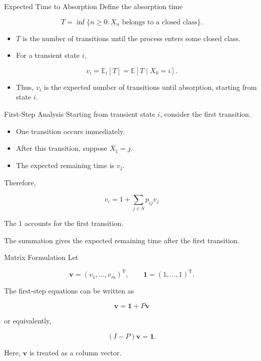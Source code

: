 \documentclass[
  ignorenonframetext,
  aspectratio=169,
]{beamer}
\providecommand{\tightlist}{%
  \setlength{\itemsep}{0pt}\setlength{\parskip}{0pt}}
\begin{document}
\begin{frame}{Expected Time to Absorption}
\protect{}\label{expected-time-to-absorption}
Define the absorption time

\[
T=\inf\{n\geq0:X_n\text{ belongs to a closed class}\}.
\]

\begin{itemize}
\tightlist
\item
  \(T\) is the number of transitions until the process enters some
  closed class.
\item
  For a transient state \(i\),
\end{itemize}

\[
v_i=\mathbb{E}_i[T]=\mathbb{E}[T\mid X_0=i].
\]

\begin{itemize}
\tightlist
\item
  Thus, \(v_i\) is the expected number of transitions until absorption,
  starting from state \(i\).
\end{itemize}
\end{frame}

\begin{frame}{First-Step Analysis}
\protect{}\label{first-step-analysis}
Starting from transient state \(i\), consider the first transition.

\begin{itemize}
\tightlist
\item
  One transition occurs immediately.
\item
  After this transition, suppose \(X_1=j\).
\item
  The expected remaining time is \(v_j\).
\end{itemize}

Therefore,

\[
\boxed{
v_i=1+\sum_{j\in S}p_{ij}v_j
}
\]

The \(1\) accounts for the first transition.

The summation gives the expected remaining time after the first
transition.
\end{frame}

\begin{frame}{Matrix Formulation}
\protect{}\label{matrix-formulation-1}
Let

\[
\mathbf{v}=(v_1,\ldots,v_m)^\mathsf{T},
\qquad
\mathbf{1}=(1,\ldots,1)^\mathsf{T}.
\]

The first-step equations can be written as

\[
\boxed{
\mathbf{v}=\mathbf{1}+P\mathbf{v}
}
\]

or equivalently,

\[
\boxed{
(I-P)\mathbf{v}=\mathbf{1}.
}
\]

Here, \(\mathbf{v}\) is treated as a column vector.
\end{frame}
\end{document}
